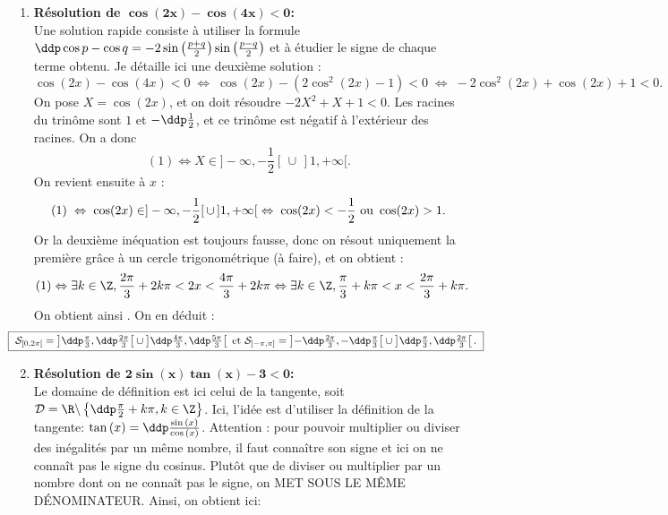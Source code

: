 \begin{correction}    \;
\begin{enumerate}
\item \textbf{R\'esolution de $\mathbf{ \cos{(2x)}-\cos{(4x)}<0   }$:}\\
Une solution rapide consiste \`a utiliser la formule $\ddp\cos p - \cos q = -2 \sin\left(\frac{p+q}{2}\right)\sin\left(\frac{p-q}{2}\right)$ et \`a \'etudier le signe de chaque terme obtenu. Je d\'etaille ici une deuxi\`eme solution :
$$\cos{(2x)}-\cos{(4x)}<0 \; \Leftrightarrow \; \cos(2x) - (2\cos^2(2x)-1)<0 \; \Leftrightarrow \; -2 \cos^2(2x) + \cos(2x) +1 <0.$$
On pose $X = \cos(2x)$, et on doit r\'esoudre $-2X^2+X+1 <0$. Les racines du trin\^ome sont $1$ et $-\ddp\frac{1}{2}$, et ce trin\^ome est n\'egatif \`a l'ext\'erieur des racines. On a donc 
$$(1) \Leftrightarrow X \in ]-\infty, -\frac{1}{2}[ \, \cup \, ]1, +\infty[.$$
On revient ensuite \`a $x$ :
$$(1) \; \Leftrightarrow \; \cos (2x) \in ]-\infty, -\frac{1}{2}[ \, \cup \, ]1, +\infty[ \; \Leftrightarrow \; \cos (2x) < -\frac{1}{2} \textmd{ ou } \cos (2x) >1.$$ 
Or la deuxi\`eme in\'equation est toujours fausse, donc on r\'esout uniquement la premi\`ere gr\^ace \`a un cercle trigonom\'etrique (\`a faire), et on obtient :
$$(1) \Leftrightarrow \exists k \in \Z, \frac{2\pi}{3} + 2k \pi < 2x <  \frac{4\pi}{3} + 2k \pi \Leftrightarrow \exists k \in \Z, \frac{\pi}{3} + k \pi < x <  \frac{2\pi}{3} + k \pi .$$
On obtient ainsi \fbox{$\ddp \mathcal{S}_\R = \bigcup_{k \in \Z} \left]\frac{\pi}{3} + k \pi, \frac{2\pi}{3} + k \pi \right[$}. On en d\'eduit :
\begin{equation*}
\hspace{-0.9cm} \fbox{
$\mathcal{S}_{\lbrack 0,2\pi\lbrack}=\left\rbrack \ddp\frac{\pi}{3},\ddp\frac{2\pi}{3}  \right\lbrack\cup\left\rbrack \ddp\frac{4\pi}{3},\ddp\frac{5\pi}{3}  \right\lbrack
\ \hbox{et}\ \mathcal{S}_{\rbrack -\pi,\pi\rbrack}=\left\rbrack  -\ddp\frac{2\pi}{3},-\ddp\frac{\pi}{3}  \right\lbrack\cup\left\rbrack  \ddp\frac{\pi}{3},\ddp\frac{2\pi}{3}  \right\lbrack   .$
}
\end{equation*}
\item \textbf{R\'esolution de $\mathbf{2\sin{(x)}\tan{(x)}-3<0  }$:}\\
\noindent Le domaine de d\'efinition est ici celui de la tangente, soit $\mathcal{D} = \R \backslash \left\{ \ddp \frac{\pi}{2} + k\pi, k \in \Z\right\}$. Ici, l'id\'ee est d'utiliser la d\'efinition de la tangente: $\tan{(x)}=\ddp\frac{\sin{(x)}}{\cos{(x)}}$. Attention : pour pouvoir multiplier ou diviser des in\'egalit\'es par un m\^{e}me nombre, il faut conna\^{i}tre son signe et ici on ne conna\^{i}t pas le signe du cosinus. Plut\^{o}t que de diviser ou multiplier par un nombre dont on ne conna\^{i}t pas le signe, on MET SOUS LE M\^EME D\'ENOMINATEUR. Ainsi, on obtient ici:

\end{enumerate}
\end{correction}
